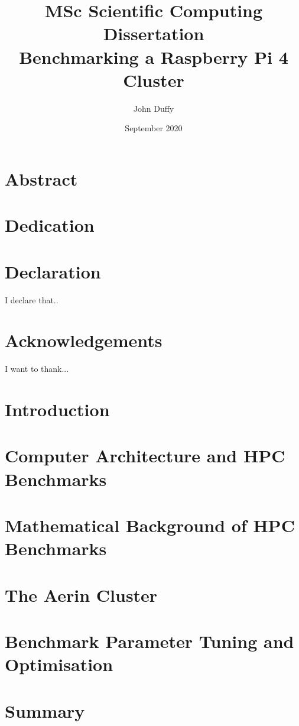 \documentclass{report}
\title{MSc Scientific Computing Dissertation\\Benchmarking a Raspberry Pi 4 Cluster}
\author{John Duffy}
\date{September 2020}
\begin{document}
%
%
\maketitle
%


%
%
\chapter*{Abstract}
%


%
%
\chapter*{Dedication}


%
% 
\chapter*{Declaration}
I declare that..


%
%
\chapter*{Acknowledgements}
I want to thank...


%
%
\tableofcontents


%
%
\chapter{Introduction}



%
%
\chapter{Computer Architecture and HPC Benchmarks}



%
%
\chapter{Mathematical Background of HPC Benchmarks}



%
%
\chapter{The Aerin Cluster}



%
%
\chapter{Benchmark Parameter Tuning and Optimisation}



%
%
\chapter{Summary}

\end{document}
